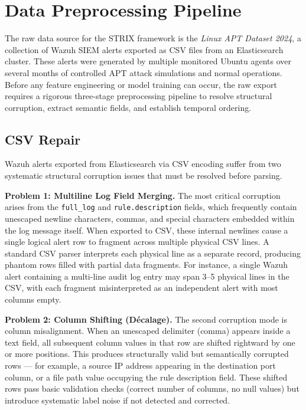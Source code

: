 \section{Data Preprocessing Pipeline}
\label{sec:preprocessing}

The raw data source for the STRIX framework is the \textit{Linux APT Dataset 2024}, a collection of Wazuh SIEM alerts exported as CSV files from an Elasticsearch cluster. These alerts were generated by multiple monitored Ubuntu agents over several months of controlled APT attack simulations and normal operations. Before any feature engineering or model training can occur, the raw export requires a rigorous three-stage preprocessing pipeline to resolve structural corruption, extract semantic fields, and establish temporal ordering.

\subsection{CSV Repair}
\label{subsec:csv_repair}

Wazuh alerts exported from Elasticsearch via CSV encoding suffer from two systematic structural corruption issues that must be resolved before parsing.

\textbf{Problem 1: Multiline Log Field Merging.} The most critical corruption arises from the \texttt{full\_log} and \texttt{rule.description} fields, which frequently contain unescaped newline characters, commas, and special characters embedded within the log message itself. When exported to CSV, these internal newlines cause a single logical alert row to fragment across multiple physical CSV lines. A standard CSV parser interprets each physical line as a separate record, producing phantom rows filled with partial data fragments. For instance, a single Wazuh alert containing a multi-line audit log entry may span 3--5 physical lines in the CSV, with each fragment misinterpreted as an independent alert with most columns empty.

\textbf{Problem 2: Column Shifting (D\'{e}calage).} The second corruption mode is column misalignment. When an unescaped delimiter (comma) appears inside a text field, all subsequent column values in that row are shifted rightward by one or more positions. This produces structurally valid but semantically corrupted rows --- for example, a source IP address appearing in the destination port column, or a file path value occupying the rule description field. These shifted rows pass basic validation checks (correct number of columns, no null values) but introduce systematic label noise if not detected and corrected.

